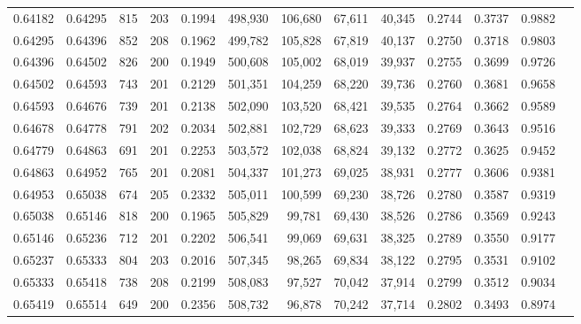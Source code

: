 \begin{tabular}{rrrrrrrrrrrrr}
0.64182 & 0.64295 &   815 & 203 &                                     0.1994 & 498,930 & 106,680 &  67,611 &  40,345 & 0.2744 & 0.3737 & 0.9882 \\
0.64295 & 0.64396 &   852 & 208 &                                     0.1962 & 499,782 & 105,828 &  67,819 &  40,137 & 0.2750 & 0.3718 & 0.9803 \\
0.64396 & 0.64502 &   826 & 200 &                                     0.1949 & 500,608 & 105,002 &  68,019 &  39,937 & 0.2755 & 0.3699 & 0.9726 \\
0.64502 & 0.64593 &   743 & 201 &                                     0.2129 & 501,351 & 104,259 &  68,220 &  39,736 & 0.2760 & 0.3681 & 0.9658 \\
0.64593 & 0.64676 &   739 & 201 &                                     0.2138 & 502,090 & 103,520 &  68,421 &  39,535 & 0.2764 & 0.3662 & 0.9589 \\
0.64678 & 0.64778 &   791 & 202 &                                     0.2034 & 502,881 & 102,729 &  68,623 &  39,333 & 0.2769 & 0.3643 & 0.9516 \\
0.64779 & 0.64863 &   691 & 201 &                                     0.2253 & 503,572 & 102,038 &  68,824 &  39,132 & 0.2772 & 0.3625 & 0.9452 \\
0.64863 & 0.64952 &   765 & 201 &                                     0.2081 & 504,337 & 101,273 &  69,025 &  38,931 & 0.2777 & 0.3606 & 0.9381 \\
0.64953 & 0.65038 &   674 & 205 &                                     0.2332 & 505,011 & 100,599 &  69,230 &  38,726 & 0.2780 & 0.3587 & 0.9319 \\
0.65038 & 0.65146 &   818 & 200 &                                     0.1965 & 505,829 &  99,781 &  69,430 &  38,526 & 0.2786 & 0.3569 & 0.9243 \\
0.65146 & 0.65236 &   712 & 201 &                                     0.2202 & 506,541 &  99,069 &  69,631 &  38,325 & 0.2789 & 0.3550 & 0.9177 \\
0.65237 & 0.65333 &   804 & 203 &                                     0.2016 & 507,345 &  98,265 &  69,834 &  38,122 & 0.2795 & 0.3531 & 0.9102 \\
0.65333 & 0.65418 &   738 & 208 &                                     0.2199 & 508,083 &  97,527 &  70,042 &  37,914 & 0.2799 & 0.3512 & 0.9034 \\
0.65419 & 0.65514 &   649 & 200 &                                     0.2356 & 508,732 &  96,878 &  70,242 &  37,714 & 0.2802 & 0.3493 & 0.8974 \\

\end{tabular}
